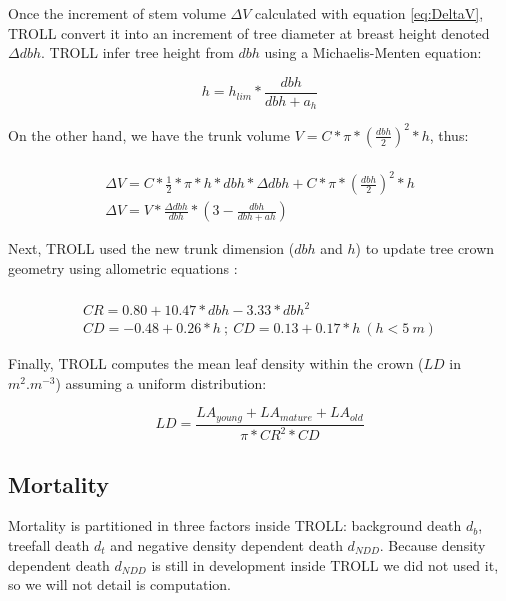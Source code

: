 \documentclass[12pt,]{article}
\theoremstyle{definition}
\theoremstyle{definition}
\theoremstyle{remark}
\begin{document}
Once the increment of stem volume \(\Delta V\) calculated with equation
\eqref{eq:DeltaV}, TROLL convert it into an increment of tree diameter at
breast height denoted \(\Delta dbh\). TROLL infer tree height from
\(dbh\) using a Michaelis-Menten equation:

\begin{equation}
  h = h_{lim}*\frac{dbh}{dbh + a_h}
  \label{eq:h}
\end{equation}

On the other hand, we have the trunk volume
\(V = C * \pi * (\frac{dbh}{2})^2*h\), thus:

\begin{equation}
  \begin{array}{c} \\
    \Delta V = C*\frac{1}{2}*\pi*h*dbh*\Delta dbh + C * \pi * (\frac{dbh}{2})^2*h \\
    \Delta V = V*\frac{\Delta dbh}{dbh}*(3-\frac{dbh}{dbh + ah})
  \end{array}
  \label{eq:Deltadbh}
\end{equation}

Next, TROLL used the new trunk dimension (\(dbh\) and \(h\)) to update
tree crown geometry using allometric equations \citep{Chave2005}:

\begin{equation}
  \begin{array}{c} \\
    CR = 0.80 + 10.47*dbh - 3.33*dbh^2\\
    CD = -0.48 + 0.26*h~;~CD = 0.13 + 0.17*h~(h<5~m)
  \end{array}
  \label{eq:C}
\end{equation}

Finally, TROLL computes the mean leaf density within the crown (\(LD\)
in \(m^2.m^{-3}\)) assuming a uniform distribution:

\begin{equation}
  LD = \frac{LA_{young}+LA_{mature}+LA_{old}}{\pi*CR^2*CD}
  \label{eq:LD}
\end{equation}

\subsection{Mortality}\label{mortality}

Mortality is partitioned in three factors inside TROLL: background death
\(d_b\), treefall death \(d_t\) and negative density dependent death
\(d_{NDD}\). Because density dependent death \(d_{NDD}\) is still in
development inside TROLL we did not used it, so we will not detail is
computation.
\end{document}
